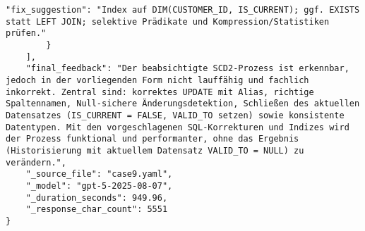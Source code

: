\begin{lstlisting}[caption={Ausgabe: GPT-5 Anwendungsfall 9 Hauptdurchlauf},label={gpt_case9_prompt1}]
            "fix_suggestion": "Index auf DIM(CUSTOMER_ID, IS_CURRENT); ggf. EXISTS statt LEFT JOIN; selektive Prädikate und Kompression/Statistiken prüfen."
        }
    ],
    "final_feedback": "Der beabsichtigte SCD2-Prozess ist erkennbar, jedoch in der vorliegenden Form nicht lauffähig und fachlich inkorrekt. Zentral sind: korrektes UPDATE mit Alias, richtige Spaltennamen, Null-sichere Änderungsdetektion, Schließen des aktuellen Datensatzes (IS_CURRENT = FALSE, VALID_TO setzen) sowie konsistente Datentypen. Mit den vorgeschlagenen SQL-Korrekturen und Indizes wird der Prozess funktional und performanter, ohne das Ergebnis (Historisierung mit aktuellem Datensatz VALID_TO = NULL) zu verändern.",
    "_source_file": "case9.yaml",
    "_model": "gpt-5-2025-08-07",
    "_duration_seconds": 949.96,
    "_response_char_count": 5551
}
\end{lstlisting}

